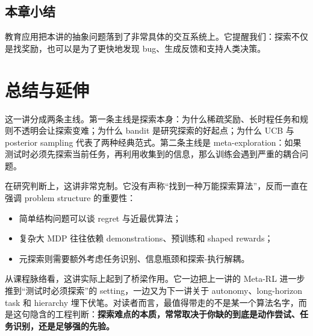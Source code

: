 \documentclass[a4paper]{article}
\begin{document}
\subsection{本章小结}
教育应用把本讲的抽象问题落到了非常具体的交互系统上。它提醒我们：探索不仅是找奖励，也可以是为了更快地发现 bug、生成反馈和支持人类决策。

\section{总结与延伸}
这一讲分成两条主线。第一条主线是探索本身：为什么稀疏奖励、长时程任务和规则不透明会让探索变难；为什么 bandit 是研究探索的好起点；为什么 UCB 与 posterior sampling 代表了两种经典范式。第二条主线是 meta-exploration：如果测试时必须先探索当前任务，再利用收集到的信息，那么训练会遇到严重的耦合问题。

在研究判断上，这讲非常克制。它没有声称“找到一种万能探索算法”，反而一直在强调 problem structure 的重要性：
\begin{itemize}
\item 简单结构问题可以谈 regret 与近最优算法；
\item 复杂大 MDP 往往依赖 demonstrations、预训练和 shaped rewards；
\item 元探索则需要额外考虑任务识别、信息瓶颈和探索-执行解耦。
\end{itemize}

从课程脉络看，这讲实际上起到了桥梁作用。它一边把上一讲的 Meta-RL 进一步推到“测试时必须探索”的 setting，一边又为下一讲关于 autonomy、long-horizon task 和 hierarchy 埋下伏笔。对读者而言，最值得带走的不是某一个算法名字，而是这句隐含的工程判断：\textbf{探索难点的本质，常常取决于你缺的到底是动作尝试、任务识别，还是足够强的先验。}
\end{document}

